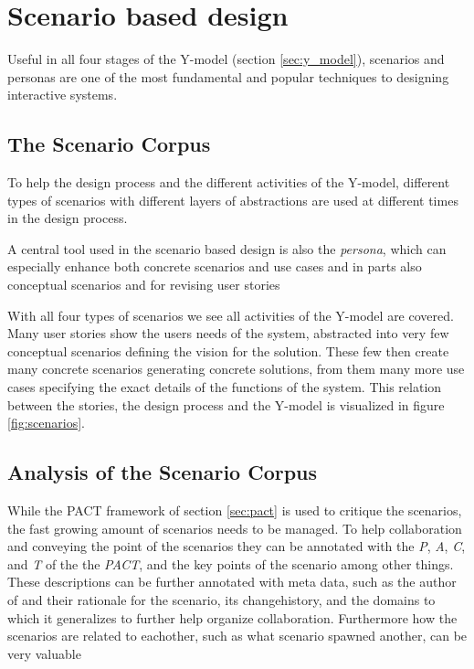 \section{Scenario based design} \label{sec:scenario_based_design}
Useful in all four stages of the Y-model (section \ref{sec:y_model}), scenarios and personas are one of the most fundamental and popular techniques to designing interactive systems. \cite[p. 62]{benyon14}

\subsection{The Scenario Corpus}
To help the design process and the different activities of the Y-model, different types of scenarios with different layers of abstractions are used at different times in the design process.






A central tool used in the scenario based design is also the \emph{persona}, which can especially enhance both concrete scenarios and use cases and in parts also conceptual scenarios and for revising user stories



With all four types of scenarios we see all activities of the Y-model are covered. Many user stories show the users needs of the system, abstracted into very few conceptual scenarios defining the vision for the solution. These few then create many concrete scenarios generating concrete solutions, from them many more use cases specifying the exact details of the functions of the system. This relation between the stories, the design process and the Y-model is visualized in figure \ref{fig:scenarios}. \cite[p. 66, 196]{benyon14}





\subsection{Analysis of the Scenario Corpus}
While the PACT framework of section \ref{sec:pact} is used to critique the scenarios, the fast growing amount of scenarios needs to be managed. To help collaboration and conveying the point of the scenarios they can be annotated with the \emph{P}, \emph{A}, \emph{C}, and \emph{T} of the the \emph{PACT}, and the key points of the scenario among other things. These descriptions can be further annotated with meta data, such as the author of and their rationale for the scenario, its changehistory, and the domains to which it generalizes to further help organize collaboration. Furthermore how the scenarios are related to eachother, such as what scenario spawned another, can be very valuable \cite[p. 70,72]{benyon14}

